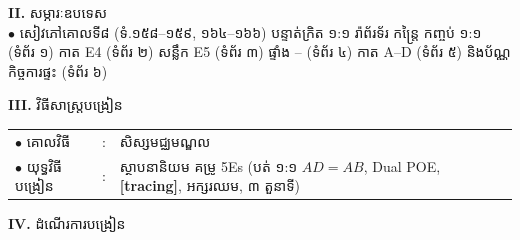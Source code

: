 \documentclass[a4paper,10pt]{article}
\newcommand{\cnum}[1]{{\fontsize{10.5pt}{12pt}\selectfont\ding{\numexpr181+#1\relax}}\hspace{0.2em}}
\begin{document}
{\vspace{1pt}

\textbf{II.} {\muol សម្ភារៈឧបទេស}\\[1pt]
\hspace*{0.55cm}$\bullet$ \hspace{0.35cm} សៀវភៅគោលទី៨ (ទំ.១៥៨--១៥៩, ១៦៤--១៦៦) បន្ទាត់ក្រិត ១:១ រ៉ាព័រទ័រ កន្ត្រៃ កញ្ចប់ ១:១ (ទំព័រ ១) កាត E4 (ទំព័រ ២) សន្លឹក E5 (ទំព័រ ៣) ផ្ទាំង \cnum{1}--\cnum{5} (ទំព័រ ៤) កាត A--D (ទំព័រ ៥) និងប័ណ្ណកិច្ចការផ្ទះ (ទំព័រ ៦)

\vspace{1pt}

\textbf{III.} {\muol វិធីសាស្រ្តបង្រៀន}\\[1pt]
\hspace*{0.45cm}%
\begin{tabular}{@{}l l L{14.85cm}@{}}
  $\bullet$ \hspace{0.25cm} គោលវិធី & : & សិស្សមជ្ឈមណ្ឌល \\
  $\bullet$ \hspace{0.25cm} យុទ្ធវិធីបង្រៀន & : & ស្ថាបនានិយម គម្រូ 5Es (បត់ ១:១ $AD=AB$, Dual POE, \textbf{[tracing]}, អក្សរឈម, ៣ តួនាទី) \\
\end{tabular}
}

\vspace{1pt}

\textbf{IV.} {\muol ដំណើរការបង្រៀន}

\vspace{1pt}
\end{document}
